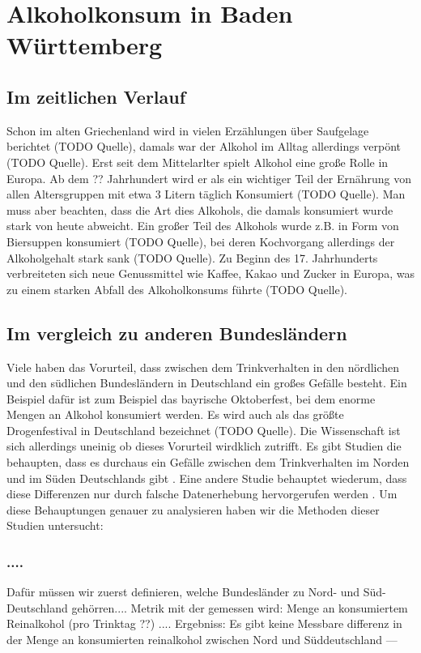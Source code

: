 \documentclass{article}
\begin{document}
\section{Alkoholkonsum in Baden Württemberg}



\subsection{Im zeitlichen Verlauf}
Schon im alten Griechenland wird in vielen Erzählungen über Saufgelage berichtet (TODO Quelle), damals war der Alkohol im Alltag allerdings verpönt (TODO Quelle). Erst seit dem Mittelarlter spielt Alkohol eine große Rolle in Europa. Ab dem ?? Jahrhundert wird er als ein wichtiger Teil der Ernährung von allen Altersgruppen mit etwa 3 Litern täglich Konsumiert (TODO Quelle). Man muss aber beachten, dass die Art dies Alkohols, die damals konsumiert wurde stark von heute abweicht. Ein großer Teil des Alkohols wurde z.B. in Form von Biersuppen konsumiert (TODO Quelle), bei deren Kochvorgang allerdings der Alkoholgehalt stark sank (TODO Quelle). Zu Beginn des 17. Jahrhunderts verbreiteten sich neue Genussmittel wie Kaffee, Kakao und Zucker in Europa, was zu einem starken Abfall des Alkoholkonsums führte (TODO Quelle). 

\subsection{Im vergleich zu anderen Bundesländern}
Viele haben das Vorurteil, dass zwischen dem Trinkverhalten in den nördlichen und den südlichen Bundesländern in Deutschland ein großes Gefälle besteht. Ein Beispiel dafür ist zum Beispiel das bayrische Oktoberfest, bei dem enorme Mengen an Alkohol konsumiert werden. Es wird auch als das größte Drogenfestival in Deutschland bezeichnet (TODO Quelle). Die Wissenschaft ist sich allerdings uneinig ob dieses Vorurteil wirdklich zutrifft. Es gibt Studien die behaupten, dass es durchaus ein Gefälle zwischen dem Trinkverhalten im Norden und im Süden Deutschlands gibt \autocite{meyer_regionale_1998}. Eine andere Studie behauptet wiederum, dass diese Differenzen nur durch falsche Datenerhebung hervorgerufen werden \autocite{kraus_einfluss_2001}. Um diese Behauptungen genauer zu analysieren haben wir die Methoden dieser Studien untersucht: 
\subsubsection {....}
Dafür müssen wir zuerst definieren, welche Bundesländer zu Nord- und Süd- Deutschland gehörren.... 
Metrik mit der gemessen wird: Menge an konsumiertem Reinalkohol (pro Trinktag ??)
....
Ergebniss: Es gibt keine Messbare differenz in der Menge an konsumierten reinalkohol zwischen Nord und Süddeutschland
---
\end{document}
